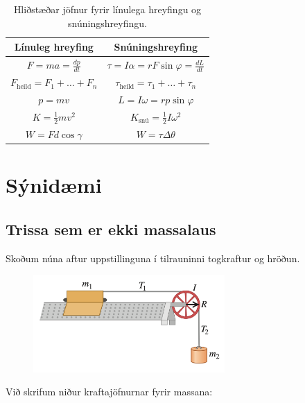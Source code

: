 \ifdefined \wholebook \else\documentclass[oneside]{book}\usepackage{EdlBook}\graphicspath{{figures/}}
\begin{document}
\begin{table}[H]
\begin{center}
\begin{tabular}{|c|c|}
\hline
\textbf{Línuleg hreyfing} & \textbf{Snúningshreyfing} \\
\hline
$F = ma = \frac{dp}{dt} $ & $\tau = I\alpha = rF\sin\varphi = \frac{dL}{dt}$ \\
$F_{\text{heild}} = F_1 + \ldots + F_n $ & $\tau_{\text{heild}} = \tau_1 + \ldots + \tau_n$ \\
$p = mv $ & $L = I\omega = rp\sin\varphi$ \\
$K = \frac{1}{2}mv^2$ & $K_{\text{snú}} = \frac{1}{2}I\omega^2$ \\
$W = Fd\cos\gamma$ & $W = \tau \Delta \theta$ \\
\hline
\end{tabular}
\caption{Hliðstæðar jöfnur fyrir línulega hreyfingu og snúningshreyfingu.}
\label{tafla:laddi}
\end{center}
\end{table}



\section{Sýnidæmi}

\subsection*{Trissa sem er ekki massalaus}

Skoðum núna aftur uppstillinguna í tilrauninni togkraftur og hröðun.

\begin{figure}[H]
    \centering
    \includegraphics[width=0.65\textwidth]{images/togkrafturoghverfitregda.png}
\end{figure}

Við skrifum niður kraftajöfnurnar fyrir massana:
\end{document}
